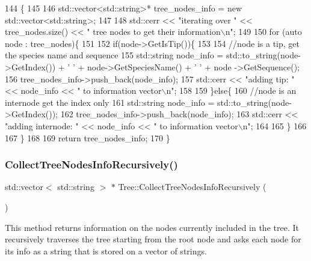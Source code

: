 \begin{DoxyCode}
144                                                            \{
145   
146   std::vector<std::string>* tree\_nodes\_info = \textcolor{keyword}{new} std::vector<std::string>;
147   
148   std::cerr << \textcolor{stringliteral}{"iterating over "} << tree\_nodes.size() << \textcolor{stringliteral}{" tree nodes to get their information\(\backslash\)n"};
149   
150   \textcolor{keywordflow}{for} (\textcolor{keyword}{auto} node : tree\_nodes)\{
151     
152     \textcolor{keywordflow}{if}(node->GetIsTip())\{
153       
154       \textcolor{comment}{//node is a tip, get the species name and sequence}
155       std::string node\_info = std::to\_string(node->GetIndex()) + \textcolor{charliteral}{' '} + node->GetSpeciesName() + \textcolor{charliteral}{' '} + node
      ->GetSequence();
156       tree\_nodes\_info->push\_back(node\_info);
157       std::cerr << \textcolor{stringliteral}{"adding tip: "} << node\_info << \textcolor{stringliteral}{" to information vector\(\backslash\)n"};
158       
159     \}\textcolor{keywordflow}{else}\{
160       \textcolor{comment}{//node is an internode get the index only}
161       std::string node\_info = std::to\_string(node->GetIndex());
162       tree\_nodes\_info->push\_back(node\_info);
163       std::cerr << \textcolor{stringliteral}{"adding internode: "} << node\_info << \textcolor{stringliteral}{" to information vector\(\backslash\)n"};
164       
165     \}
166     
167   \}
168   
169   \textcolor{keywordflow}{return} tree\_nodes\_info;
170 \}
\end{DoxyCode}
\mbox{\label{classTree_af09073cc7b7166d16213614b624f3388}} 
\subsubsection{\texorpdfstring{Collect\+Tree\+Nodes\+Info\+Recursively()}{CollectTreeNodesInfoRecursively()}}
{\footnotesize\ttfamily std\+::vector$<$ std\+::string $>$ $\ast$ Tree\+::\+Collect\+Tree\+Nodes\+Info\+Recursively (\begin{DoxyParamCaption}{ }\end{DoxyParamCaption})}

This method returns information on the nodes currently included in the tree. It recursively traverses the tree starting from the root node and asks each node for its info as a string that is stored on a vector of strings.


